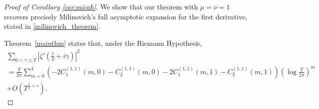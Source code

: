 \documentclass[10pt,a4paper]{amsart}
\begin{document}
\begin{proof}[Proof of Corollary \ref{cor:micah}]

We show that our theorem with $\mu=\nu=1$ recovers precisely Milinovich's full asymptotic expansion for the first derivative, stated in \eqref{milinovich_theorem}.

Theorem~\ref{mainthm} states that, under the Riemann Hypothesis,
\begin{multline*}
\sum_{0<\gamma\le T}\left|\zeta'\left(\frac{1}{2}+i\gamma\right)\right|^2 \\
= \frac{T}{2\pi} \sum_{m=0}^4 (-2C_1^{(1,1)}(m,0) -C_2^{(1,1)}(m,0) -  2C_1^{(1,1)}(m,1) - C_2^{(1,1)}(m,1)) \left(\log\frac{T}{2\pi}\right)^m \\
+ O\left(T^{\frac{1}{2}+\varepsilon}\right).
\end{multline*}


\end{proof}
\end{document}
